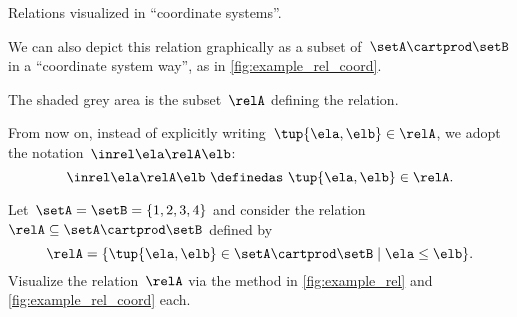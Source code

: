 \begin{marginfigure}
	\centering
	\caption{Relations visualized in ``coordinate systems''.}
	\label{fig:example_rel_coord}
\end{marginfigure}

We can also depict this relation graphically as a subset of~$\setA \cartprod \setB$ in a ``coordinate system way'', as in \cref{fig:example_rel_coord}.

The shaded grey area is the subset~$\relA$ defining the relation.

\begin{remark}
	From now on, instead of explicitly writing~$\tup{\ela,\elb}\in \relA$, we adopt the notation~$\inrel \ela \relA \elb$:
	\begin{equation}
		\inrel \ela \relA \elb \ \definedas\  \tup{\ela,\elb}\in \relA.
	\end{equation}

\end{remark}

\vfill
\begin{gradedexercise}
	\label{ex:visualize-leq-relation}
	Let~$\setA = \setB = \{1, 2, 3, 4 \}$ and consider the relation~$\relA \subseteq \setA \cartprod \setB$ defined by
	\begin{equation}
		\relA = \{ \tup{\ela,\elb} \in \setA \cartprod \setB \mid \ela \leq \elb \}.
	\end{equation}
	Visualize the relation~$\relA$ via the method in \cref{fig:example_rel} and \cref{fig:example_rel_coord} each.
\end{gradedexercise}

